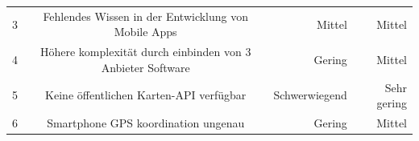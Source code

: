 \documentclass[ngerman,]{article}
\begin{document}
\begin{longtable}[]{@{}rcrr@{}}
\begin{minipage}[t]{0.06\columnwidth}
3\strut
\end{minipage} & \begin{minipage}[t]{0.50\columnwidth}\centering\strut
Fehlendes Wissen in der Entwicklung von Mobile Apps\strut
\end{minipage} & \begin{minipage}[t]{0.14\columnwidth}\raggedleft\strut
Mittel\strut
\end{minipage} & \begin{minipage}[t]{0.19\columnwidth}\raggedleft\strut
Mittel\strut
\end{minipage}\tabularnewline
\begin{minipage}[t]{0.06\columnwidth}\raggedleft\strut
4\strut
\end{minipage} & \begin{minipage}[t]{0.50\columnwidth}\centering\strut
Höhere komplexität durch einbinden von 3 Anbieter Software\strut
\end{minipage} & \begin{minipage}[t]{0.14\columnwidth}\raggedleft\strut
Gering\strut
\end{minipage} & \begin{minipage}[t]{0.19\columnwidth}\raggedleft\strut
Mittel\strut
\end{minipage}\tabularnewline
\begin{minipage}[t]{0.06\columnwidth}\raggedleft\strut
5\strut
\end{minipage} & \begin{minipage}[t]{0.50\columnwidth}\centering\strut
Keine öffentlichen Karten-API verfügbar\strut
\end{minipage} & \begin{minipage}[t]{0.14\columnwidth}\raggedleft\strut
Schwerwiegend\strut
\end{minipage} & \begin{minipage}[t]{0.19\columnwidth}\raggedleft\strut
Sehr gering\strut
\end{minipage}\tabularnewline
\begin{minipage}[t]{0.06\columnwidth}\raggedleft\strut
6\strut
\end{minipage} & \begin{minipage}[t]{0.50\columnwidth}\centering\strut
Smartphone GPS koordination ungenau\strut
\end{minipage} & \begin{minipage}[t]{0.14\columnwidth}\raggedleft\strut
Gering\strut
\end{minipage} & \begin{minipage}[t]{0.19\columnwidth}\raggedleft\strut
Mittel\strut
\end{minipage}\tabularnewline
\bottomrule
\end{longtable}
\end{document}
